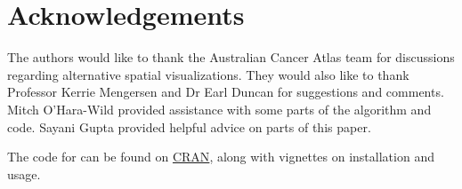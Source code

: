 \documentclass[
]{jss}
\begin{document}
\hypertarget{acknowledgements}{%
\section{Acknowledgements}\label{acknowledgements}}

The authors would like to thank the Australian Cancer Atlas team for
discussions regarding alternative spatial visualizations. They would
also like to thank Professor Kerrie Mengersen and Dr Earl Duncan for
suggestions and comments. Mitch O'Hara-Wild provided assistance with
some parts of the algorithm and code. Sayani Gupta provided helpful
advice on parts of this paper.

The code for  \citep{sugarbag} can be found on
\href{https://cran.r-project.org/web/packages/sugarbag/index.html}{CRAN},
along with vignettes on installation and usage.


\end{document}
